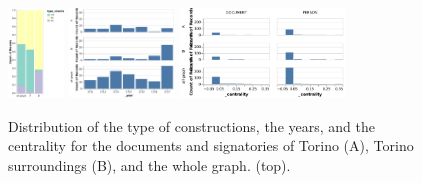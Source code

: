 \begin{figure}[!ht]
    \centering



    \includegraphics[height=90px]{static/figures/ComBiNet/OriginalPaperFigures/CGF/TurinPlots/type+chantier.pdf}
    \includegraphics[height=90px]{static/figures/ComBiNet/OriginalPaperFigures/CGF/TurinPlots/time.pdf}
    \includegraphics[height=90px]{static/figures/ComBiNet/OriginalPaperFigures/CGF/TurinPlots/centrality.pdf}

    \caption{Distribution of the type of constructions, the years, and the centrality for the documents and signatories of Torino (A), Torino surroundings (B), and the whole graph. (top).}\label{fig:attributeComparison}
\end{figure}


